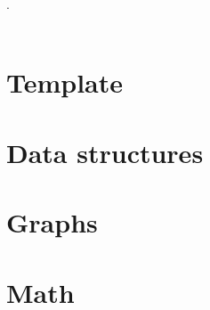 

\def\title{Universidad Autonoma de Ciudad Juarez - First to Penalty}
.\\[0.2cm]
 \\[0.5cm]
\tableofcontents\newpage

\section{Template}
\section{Data structures}


\section{Graphs}

\section{Math}
